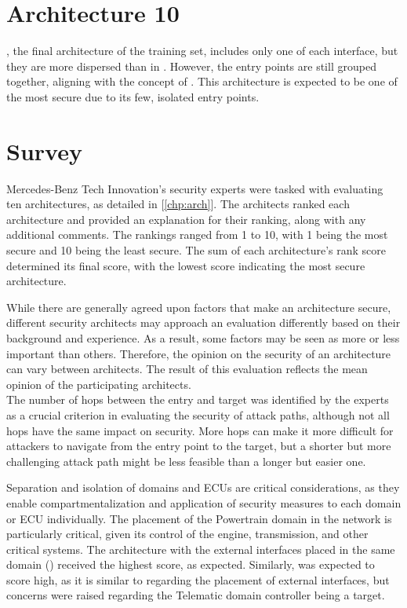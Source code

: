 \section{Architecture 10}
\label{subsec:arch10}

, the final architecture of the training set, includes only one of each interface, 
but they are more dispersed than in . 
However, the entry points are still grouped together, aligning with the concept of . 
This architecture is expected to be one of the most secure due to its few, isolated entry points.

\section{Survey}
\label{sec:survey}

Mercedes-Benz Tech Innovation's security experts were tasked with evaluating ten architectures, 
as detailed in [\ref{chp:arch}]. The architects ranked each architecture and provided an explanation 
for their ranking, along with any additional comments. 
The rankings ranged from 1 to 10, with 1 being the most secure and 10 being the least secure. 
The sum of each architecture's rank score determined its final score, 
with the lowest score indicating the most secure architecture.

While there are generally agreed upon factors that make an architecture secure, 
different security architects may approach an evaluation differently based on their background and experience. 
As a result, some factors may be seen as more or less important than others. 
Therefore, the opinion on the security of an architecture can vary between architects. 
The result of this evaluation reflects the mean opinion of the participating architects.\\

The number of hops between the entry and target was identified by the experts as a 
crucial criterion in evaluating the security of attack paths, although not all hops have the same impact on security. 
More hops can make it more difficult for attackers to navigate from the entry point to the target, 
but a shorter but more challenging attack path might be less feasible than a longer but easier one. 

Separation and isolation of domains and ECUs are critical considerations, 
as they enable compartmentalization and application of security measures to each domain or ECU individually. 
The placement of the Powertrain domain in the network is particularly critical, 
given its control of the engine, transmission, and other critical systems. 
The architecture with the external interfaces placed in the same domain () 
received the highest score, as expected. 
Similarly,  was expected to score high, as it is similar to  
regarding the placement of external interfaces, but concerns were raised regarding the Telematic domain controller being a target.

